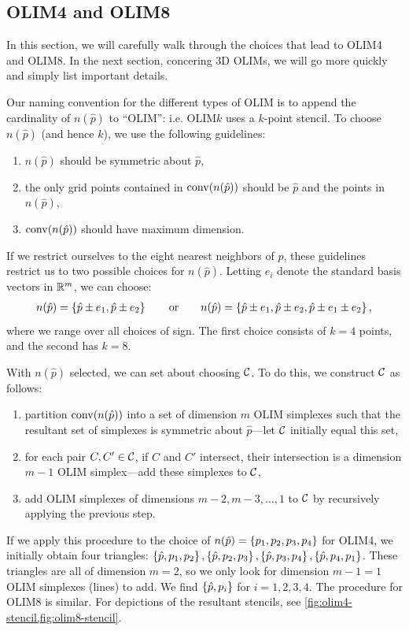 \documentclass{article}
\begin{document}
\subsection{OLIM4 and OLIM8}

In this section, we will carefully walk through the choices that lead
to OLIM4 and OLIM8. In the next section, concering 3D OLIMs, we will
go more quickly and simply list important details.

Our naming convention for the different types of OLIM is to append the
cardinality of $n(\hat{p})$ to ``OLIM'': i.e. OLIM$k$ uses a $k$-point
stencil. To choose $n(\hat{p})$ (and hence $k$), we use the following
guidelines:
\begin{enumerate}
\item $n(\hat{p})$ should be symmetric about $\hat{p}$,
\item the only grid points contained in $\operatorname{conv}(n(\hat{p}))$ should be
  $\hat{p}$ and the points in $n(\hat{p})$,
\item $\operatorname{conv}(n(\hat{p}))$ should have maximum dimension.
\end{enumerate}
If we restrict ourselves to the eight nearest neighbors of $\hat{p}$,
these guidelines restrict us to two possible choices for
$n(\hat{p})$. Letting $e_i$ denote the standard basis vectors in
$\mathbb{R}^m$, we can choose:
\begin{align*}
  n(\hat{p}) = \left\{\hat{p} \pm e_1, \hat{p} \pm e_2\right\} \qquad \mbox{or} \qquad n(\hat{p}) = \left\{\hat{p} \pm e_1, \hat{p} \pm e_2, \hat{p} \pm e_1 \pm e_2\right\},
\end{align*}
where we range over all choices of sign. The first choice consists of
$k = 4$ points, and the second has $k = 8$.

With $n(\hat{p})$ selected, we can set about choosing $\mathcal{C}$. To do
this, we construct $\mathcal{C}$ as follows:
\begin{enumerate}
\item partition $\operatorname{conv}(n(\hat{p}))$ into a set of dimension $m$ OLIM
  simplexes such that the resultant set of simplexes is symmetric
  about $\hat{p}$---let $\mathcal{C}$ initially equal this set,
\item for each pair $C, C' \in \mathcal{C}$, if $C$ and $C'$ intersect, their intersection is a dimension $m - 1$ OLIM simplex---add these simplexes to $\mathcal{C}$,
\item add OLIM simplexes of dimensions $m - 2, m - 3, \hdots, 1$ to
  $\mathcal{C}$ by recursively applying the previous step.
\end{enumerate}
If we apply this procedure to the choice of
$n(\hat{p}) = \left\{p_1, p_2, p_3, p_4\right\}$ for OLIM4, we initially obtain
four triangles:
$\left\{\hat{p}, p_1, p_2\right\}, \left\{\hat{p}, p_2, p_3\right\}, \left\{\hat{p}, p_3,
  p_4\right\}, \left\{\hat{p}, p_4, p_1\right\}$. These triangles are all of dimension
$m = 2$, so we only look for dimension $m - 1 = 1$ OLIM simplexes
(lines) to add. We find $\left\{\hat{p}, p_i\right\}$ for $i = 1, 2, 3, 4$. The
procedure for OLIM8 is similar. For depictions of the resultant
stencils, see \cref{fig:olim4-stencil,fig:olim8-stencil}.
\end{document}
